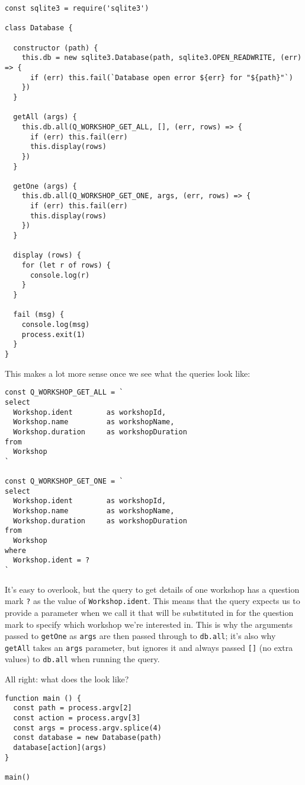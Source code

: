 \begin{verbatim}
const sqlite3 = require('sqlite3')

class Database {

  constructor (path) {
    this.db = new sqlite3.Database(path, sqlite3.OPEN_READWRITE, (err) => {
      if (err) this.fail(`Database open error ${err} for "${path}"`)
    })
  }

  getAll (args) {
    this.db.all(Q_WORKSHOP_GET_ALL, [], (err, rows) => {
      if (err) this.fail(err)
      this.display(rows)
    })
  }

  getOne (args) {
    this.db.all(Q_WORKSHOP_GET_ONE, args, (err, rows) => {
      if (err) this.fail(err)
      this.display(rows)
    })
  }

  display (rows) {
    for (let r of rows) {
      console.log(r)
    }
  }

  fail (msg) {
    console.log(msg)
    process.exit(1)
  }
}
\end{verbatim}

This makes a lot more sense once we see what the queries look like:

\begin{verbatim}
const Q_WORKSHOP_GET_ALL = `
select
  Workshop.ident        as workshopId,
  Workshop.name         as workshopName,
  Workshop.duration     as workshopDuration
from
  Workshop
`

const Q_WORKSHOP_GET_ONE = `
select
  Workshop.ident        as workshopId,
  Workshop.name         as workshopName,
  Workshop.duration     as workshopDuration
from
  Workshop
where
  Workshop.ident = ?
`
\end{verbatim}

It's easy to overlook,
but the query to get details of one workshop has a question mark \texttt{?} as the value of \texttt{Workshop.ident}.
This means that the query expects us to provide a parameter when we call it
that will be substituted in for the question mark
to specify which workshop we're interested in.
This is why the arguments passed to \texttt{getOne} as \texttt{args}
are then passed through to \texttt{db.all};
it's also why \texttt{getAll} takes an \texttt{args} parameter,
but ignores it and always passed \texttt{[]} (no extra values) to \texttt{db.all} when running the query.

All right:
what does the  look like?

\begin{verbatim}
function main () {
  const path = process.argv[2]
  const action = process.argv[3]
  const args = process.argv.splice(4)
  const database = new Database(path)
  database[action](args)
}

main()
\end{verbatim}

